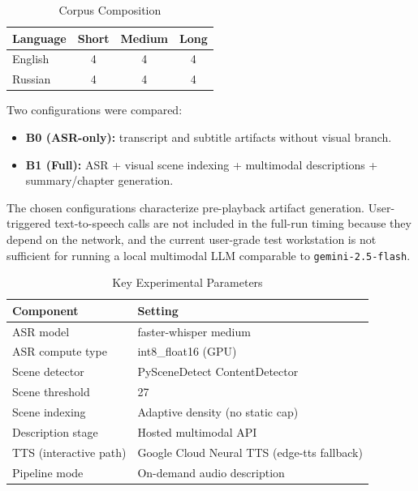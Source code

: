 \documentclass[conference]{IEEEtran}
\begin{document}
\begin{table}[t]
\caption{Corpus Composition}
\label{tab:corpus_comp}
\centering
\footnotesize
\setlength{\tabcolsep}{5pt}
\begin{tabular}{lccc}
\toprule
\textbf{Language} & \textbf{Short} & \textbf{Medium} & \textbf{Long} \\
\midrule
English & 4 & 4 & 4 \\
Russian & 4 & 4 & 4 \\
\bottomrule
\end{tabular}
\end{table}

Two configurations were compared:
\begin{itemize}
\item \textbf{B0 (ASR-only):} transcript and subtitle artifacts without visual branch.
\item \textbf{B1 (Full):} ASR + visual scene indexing + multimodal descriptions + summary/chapter generation.
\end{itemize}
The chosen configurations characterize pre-playback artifact generation. User-triggered text-to-speech calls are not included in the full-run timing because they depend on the network, and the current user-grade test workstation is not sufficient for running a local multimodal LLM comparable to \texttt{gemini-2.5-flash}.

\begin{table}[t]
\caption{Key Experimental Parameters}
\label{tab:exp_params}
\centering
\footnotesize
\setlength{\tabcolsep}{4.5pt}
\begin{tabular}{ll}
\toprule
\textbf{Component} & \textbf{Setting} \\
\midrule
ASR model & faster-whisper medium \\
ASR compute type & int8\_float16 (GPU) \\
Scene detector & PySceneDetect ContentDetector \\
Scene threshold & 27 \\
Scene indexing & Adaptive density (no static cap) \\
Description stage & Hosted multimodal API \\
TTS (interactive path) & Google Cloud Neural TTS (edge-tts fallback) \\
Pipeline mode & On-demand audio description \\
\bottomrule
\end{tabular}
\end{table}
\end{document}
